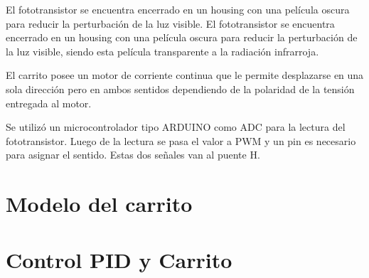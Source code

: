 \documentclass{article}
\begin{document}
El fototransistor se encuentra encerrado en un housing con una película oscura para reducir la perturbación de la luz visible. El fototransistor se encuentra encerrado en un housing con una película oscura para reducir la perturbación de la luz visible, siendo esta película transparente a la radiación infrarroja.

El carrito posee un motor de corriente continua que le permite desplazarse en una sola dirección pero en ambos sentidos dependiendo de la polaridad de la tensión entregada al motor.

Se utilizó un microcontrolador tipo ARDUINO como ADC para la lectura del fototransistor. Luego de la lectura se pasa el valor a PWM y un pin es necesario para asignar el sentido. Estas dos señales van al puente H.

\section{Modelo del carrito}


\section{Control PID y Carrito}



\newpage
\end{document}
